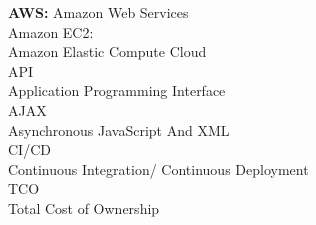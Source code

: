\textbf{AWS: }{Amazon Web Services}\\
{Amazon EC2:}\\{Amazon Elastic Compute Cloud }\\
{API}\\{Application Programming Interface}\\
{AJAX}\\{Asynchronous JavaScript And XML}\\
{CI/CD}\\{ Continuous Integration/ Continuous Deployment}\\
{TCO}\\{Total Cost of Ownership}\\

